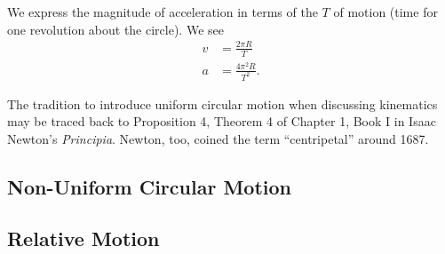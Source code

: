 We express the magnitude of acceleration in terms of the 
$T$ of motion (time for one revolution about the circle). We see
\begin{subequations}
\begin{align}
v &= \frac{2\pi R}{T}\\
a &=\frac{4\pi^{2}R}{T^{2}}.
\end{align}
\end{subequations}

\begin{rmk}
The tradition to introduce uniform circular motion when discussing
kinematics may be traced back to Proposition 4, Theorem 4 of Chapter 1,
Book I in Isaac Newton's \emph{Principia}. Newton, too, coined the term
``centripetal'' around 1687.
\end{rmk}

\subsection{Non-Uniform Circular Motion}

\subsection{Relative Motion}
